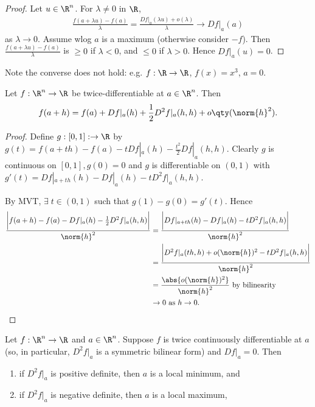 \begin{proof}
    Let $u\in \R^n$. For $\lambda\neq 0$ in $\R$,
    \begin{align*}
        \frac{f(a+\lambda u) - f(a)}{\lambda} = \frac{Df|_a(\lambda u) + o(\lambda)}{\lambda} \to Df|_a(a)
    \end{align*}
    as $\lambda\to 0$.
    Assume wlog $a$ is a maximum (otherwise consider $-f$).
    Then $\frac{f(a+\lambda u) - f(a)}{\lambda}$ is $\ge 0$ if $\lambda < 0$, and $\leq 0$ if $\lambda >0$. Hence $Df|_a(u) = 0$.
\end{proof}
Note the converse does not hold: e.g. $f:\R\to\R$, $f(x) = x^3$, $a=0$.

\begin{lemma} \label{lem:2.12}
    Let $f:\R^n\to \R$ be twice-differentiable at $a\in \R^n$. Then \[f(a+h) = f(a) + Df|_a(h) + \frac{1}{2} D^2f|_a(h,h) + o \qty(\norm{h}^2). \]
\end{lemma}

\begin{proof}
    Define $g: [0,1]: \to \R$ by $g(t) = f(a+th) - f(a) - tDf|_a(h) - \frac{t^2}{2} Df|_a(h,h)$.
    Clearly $g$ is continuous on $[0,1], g(0)=0$ and $g$ is differentiable on $(0,1)$ with $g'(t) = Df|_{a+th}(h) - Df|_a(h) - tD^2f|_a(h,h)$.

    By MVT, $\exists \; t \in (0,1)$ such that $g(1) -g(0) = g'(t)$.
    Hence
    \begin{align*}
        \frac{\bigg| f(a+h) - f(a) - Df|_a(h) -\frac{1}{2} D^2f|_a(h,h) \bigg| }{\norm{h}^2} &= \frac{ \bigg| Df|_{a+th}(h) - Df|_a(h) - tD^2f|_a(h,h) \bigg|}{\norm{h}^2}\\
        &= \frac{\bigg| D^2f|_a(th,h) + o(\norm{h})^2 - tD^2f|_a(h,h) \bigg|}{\norm{h}^2} \\
        &= \frac{\abs{o(\norm{h})^2}}{\norm{h}^2} \text{ by bilinearity} \\
        &\to 0 \text{ as } h \to 0.
    \end{align*}
\end{proof}

\begin{theorem}
    Let $f: \R^n\to \R$ and $a\in\R^n$. Suppose $f$ is twice continuously differentiable at $a$ (so, in particular, $D^2f|_a$ is a symmetric bilinear form) and $Df|_a = 0$. Then
    \begin{enumerate}
        \item if $D^2f|_a$ is positive definite, then $a$ is a local minimum, and
        \item if $D^2f|_a$ is negative definite, then $a$ is a local maximum,
    \end{enumerate}
\end{theorem}

